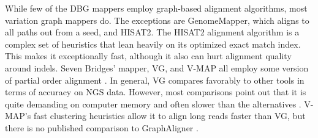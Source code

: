 While few of the DBG mappers employ graph-based alignment algorithms, most variation graph mappers do. 
The exceptions are GenomeMapper, which aligns to all paths out from a seed, and HISAT2.
The HISAT2 alignment algorithm is a complex set of heuristics that lean heavily on its optimized exact match index.  
This makes it exceptionally fast, although it also can hurt alignment quality around indels. 
Seven Bridges' mapper, VG, and V-MAP all employ some version of partial order alignment \cite{Rakocevic_2019, Garrison_2019, Vaddadi_2019}. 
In general, VG compares favorably to other tools in terms of accuracy on NGS data. 
However, most comparisons point out that it is quite demanding on computer memory and often slower than the alternatives \cite{Kim_2019, Vaddadi_2019}. 
V-MAP's fast clustering heuristics allow it to align long reads faster than VG, but there is no published comparison to GraphAligner \cite{Vaddadi_2019}.


